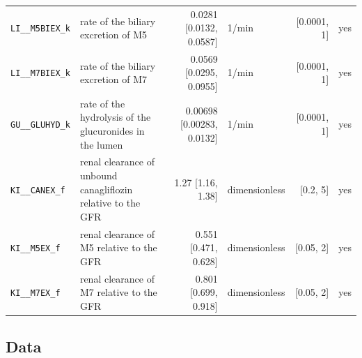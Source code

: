 \begin{longtable}{llrlrl}
\texttt{LI\_\_M5BIEX\_k} & rate of the biliary excretion of M5 & 0.0281 [0.0132, 0.0587] & 1/min & [0.0001, 1] & yes \\
\texttt{LI\_\_M7BIEX\_k} & rate of the biliary excretion of M7 & 0.0569 [0.0295, 0.0955] & 1/min & [0.0001, 1] & yes \\
\texttt{GU\_\_GLUHYD\_k} & rate of the hydrolysis of the glucuronides in the lumen & 0.00698 [0.00283, 0.0132] & 1/min & [0.0001, 1] & yes \\
\texttt{KI\_\_CANEX\_f} & renal clearance of unbound canagliflozin relative to the GFR & 1.27 [1.16, 1.38] & dimensionless & [0.2, 5] & yes \\
\texttt{KI\_\_M5EX\_f} & renal clearance of M5 relative to the GFR & 0.551 [0.471, 0.628] & dimensionless & [0.05, 2] & yes \\
\texttt{KI\_\_M7EX\_f} & renal clearance of M7 relative to the GFR & 0.801 [0.699, 0.918] & dimensionless & [0.05, 2] & yes \\
\end{longtable}

\subsection{Data}

